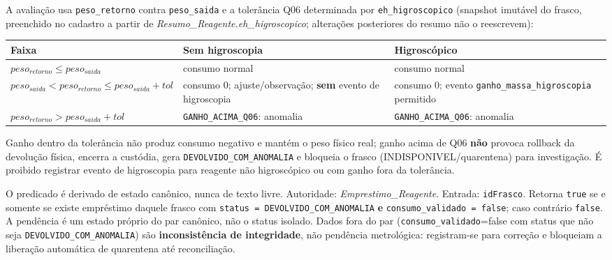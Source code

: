 \begin{regra}
A avaliação usa \texttt{peso\_retorno} contra \texttt{peso\_saida} e a tolerância Q06 determinada por \texttt{eh\_higroscopico} (snapshot imutável do frasco, preenchido no cadastro a partir de \textit{Resumo\_Reagente.eh\_higroscopico}; alterações posteriores do resumo não o reescrevem):
\begin{center}
\begin{tabular}{p{}p{}p{}}
\toprule
\textbf{Faixa} & \textbf{Sem higroscopia} & \textbf{Higroscópico} \\
\midrule
$peso_{retorno} \le peso_{saida}$ & consumo normal & consumo normal \\
$peso_{saida} < peso_{retorno} \le peso_{saida}+tol$ & consumo 0; ajuste/observação; \textbf{sem} evento de higroscopia & consumo 0; evento \texttt{ganho\_massa\_higroscopia} permitido \\
$peso_{retorno} > peso_{saida}+tol$ & \texttt{GANHO\_ACIMA\_Q06}: anomalia & \texttt{GANHO\_ACIMA\_Q06}: anomalia \\
\bottomrule
\end{tabular}
\end{center}
Ganho dentro da tolerância não produz consumo negativo e mantém o peso físico real; ganho acima de Q06 \textbf{não} provoca rollback da devolução física, encerra a custódia, gera \texttt{DEVOLVIDO\_COM\_ANOMALIA} e bloqueia o frasco (INDISPONIVEL/quarentena) para investigação. É proibido registrar evento de higroscopia para reagente não higroscópico ou com ganho fora da tolerância.
\end{regra}

\begin{regra}
O predicado é derivado de estado canônico, nunca de texto livre. Autoridade: \textit{Emprestimo\_Reagente}. Entrada: \texttt{idFrasco}. Retorna \texttt{true} se e somente se existe empréstimo daquele frasco com \texttt{status = DEVOLVIDO\_COM\_ANOMALIA} \textbf{e} \texttt{consumo\_validado = false}; caso contrário \texttt{false}. A pendência é um estado próprio do par canônico, não o status isolado. Dados fora do par (\texttt{consumo\_validado}=false com status que não seja \texttt{DEVOLVIDO\_COM\_ANOMALIA}) são \textbf{inconsistência de integridade}, não pendência metrológica: registram-se para correção e bloqueiam a liberação automática de quarentena até reconciliação.
\end{regra}

